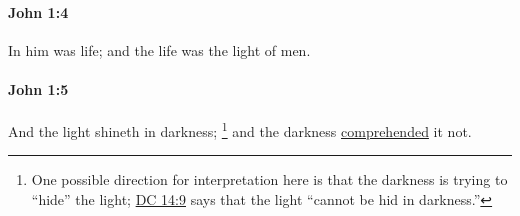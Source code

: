 		\paragraph{John 1:4} %
			\label{JOHN-1-4}

			In him was life; and the life was the light of men.

			\begin{framed}
			\scriptsize
				\begin{compactdesc}
					\item[SBLG]  \hyperref[PHOS]{} 
				\end{compactdesc}
			\end{framed}

		\paragraph{John 1:5} %
			\label{JOHN-1-5}

			And the light shineth in darkness;
				\footnote{%
					One possible direction for interpretation here is that the darkness is trying to ``hide'' the light; \hyperref[DC14-9]{DC 14:9} says that the light ``cannot be hid in darkness.''
					}%
			and the darkness \hyperref[COMPREHEND]{comprehended} it not.

